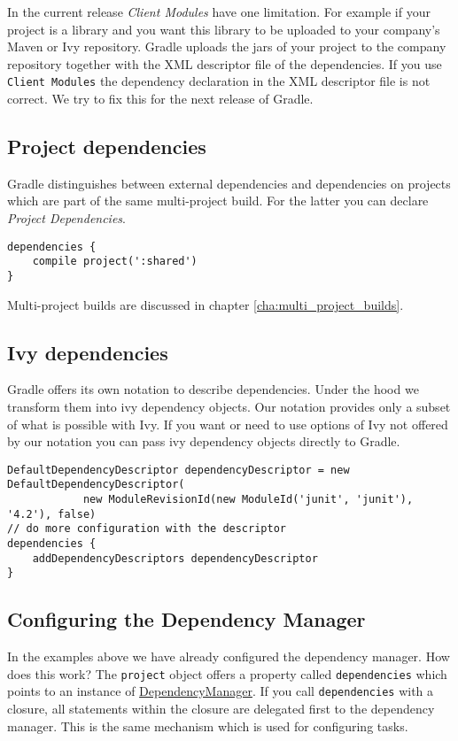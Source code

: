 In the current release \emph{Client Modules} have one limitation. For example if your project is a library and you want this library to be uploaded to your company's Maven or Ivy repository. Gradle uploads the jars of your project to the company repository together with the XML descriptor file of the dependencies. If you use \texttt{Client Modules} the dependency declaration in the XML descriptor file is not correct. We try to fix this for the next release of Gradle.

\subsection{Project dependencies} %
\label{sub:project_dependencies}
Gradle distinguishes between external dependencies and dependencies on projects which are part of the same multi-project build. For the latter you can declare \emph{Project Dependencies}.
\begin{Verbatim}
dependencies {
    compile project(':shared')
}
\end{Verbatim}
Multi-project builds are discussed in chapter \ref{cha:multi_project_builds}.

\subsection{Ivy dependencies} %
\label{sub:ivy_dependencies}
Gradle offers its own notation to describe dependencies. Under the hood we transform them into ivy dependency objects. Our notation provides only a subset of what is possible with Ivy. If you want or need to use options of Ivy not offered by our notation you can pass ivy dependency objects directly to Gradle.
\begin{Verbatim}
DefaultDependencyDescriptor dependencyDescriptor = new DefaultDependencyDescriptor(
	        new ModuleRevisionId(new ModuleId('junit', 'junit'), '4.2'), false)
// do more configuration with the descriptor
dependencies {
	addDependencyDescriptors dependencyDescriptor
}
\end{Verbatim}

\subsection{Configuring the Dependency Manager} %
\label{sub:configuring_the_dependency_manager}
In the examples above we have already configured the dependency manager. How does this work? The \texttt{project} object offers a property called \texttt{dependencies} which points to an instance of \href{\API DepencencyManager.html}{\PKG DependencyManager}. If you call \texttt{dependencies} with a closure, all statements within the closure are delegated first to the dependency manager. This is the same mechanism which is used for configuring tasks.

